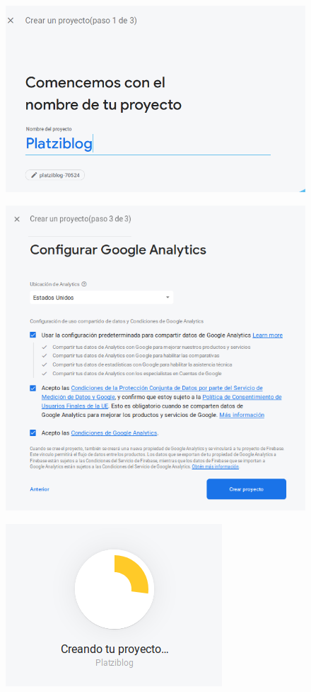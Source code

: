 \documentclass{article}
\begin{document}
\begin{figure}[h!]
  \centering
  \includegraphics[scale=0.65]{./Pictures/166_platziblog_firebase.png}
\end{figure}


\begin{figure}[h!]
  \centering
  \includegraphics[scale=0.65]{./Pictures/167_platziblog_tc_acepted.png}
\end{figure}

\newpage

\begin{figure}[h!]
  \centering
  \includegraphics[scale=0.65]{./Pictures/168_creando_platziblog.png}
\end{figure}
\end{document}
